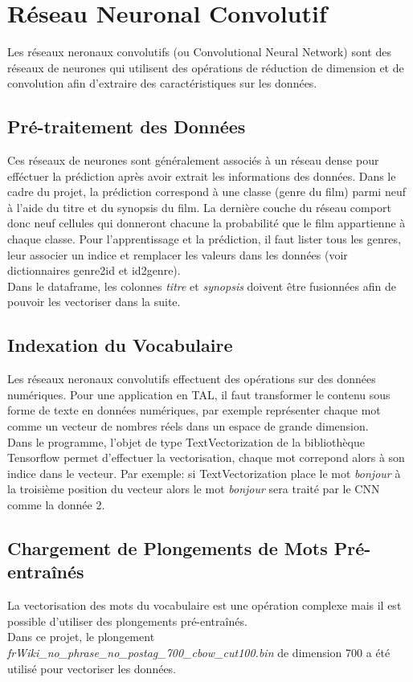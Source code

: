 \section{Réseau Neuronal Convolutif}
Les réseaux neronaux convolutifs (ou Convolutional Neural Network)\cite{cnn} sont des réseaux de neurones qui utilisent des opérations de réduction de dimension et de convolution afin d'extraire des caractéristiques sur les données.\\

\subsection{Pré-traitement des Données}
Ces réseaux de neurones sont généralement associés à un réseau dense pour efféctuer la prédiction après avoir extrait les informations des données. Dans le cadre du projet, la prédiction correspond à une classe (genre du film) parmi neuf à l'aide du titre et du synopsis du film. La dernière couche du réseau comport donc neuf cellules qui donneront chacune la probabilité que le film appartienne à chaque classe. Pour l'apprentissage et la prédiction, il faut lister tous les genres, leur associer un indice et remplacer les valeurs dans les données (voir dictionnaires \textsf{genre2id} et \textsf{id2genre}).\\
Dans le dataframe, les colonnes \textit{titre} et \textit{synopsis} doivent être fusionnées afin de pouvoir les vectoriser dans la suite.

\subsection{Indexation du Vocabulaire}
Les réseaux neronaux convolutifs effectuent des opérations sur des données numériques. Pour une application en TAL, il faut transformer le contenu sous forme de texte en données numériques, par exemple représenter chaque mot comme un vecteur de nombres réels dans un espace de grande dimension.\\
Dans le programme, l'objet de type \textsf{TextVectorization} de la bibliothèque Tensorflow \cite{tensorflow} permet d'effectuer la vectorisation, chaque mot correpond alors à son indice dans le vecteur. Par exemple: si \textsf{TextVectorization} place le mot \textit{bonjour} à la troisième position du vecteur alors le mot \textit{bonjour} sera traité par le CNN comme la donnée 2.

\subsection{Chargement de Plongements de Mots Pré-entraînés}
La vectorisation des mots du vocabulaire est une opération complexe mais il est possible d'utiliser des plongements pré-entraînés.\\
Dans ce projet, le plongement \textit{frWiki\_no\_phrase\_no\_postag\_700\_cbow\_cut100.bin} \cite{fauconnier} de dimension 700 a été utilisé pour vectoriser les données.

